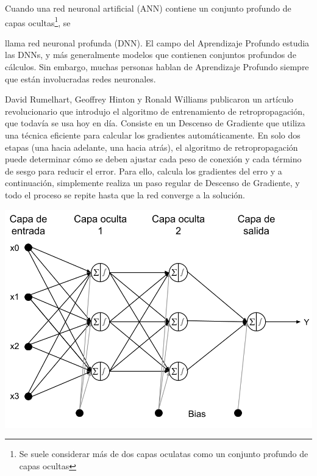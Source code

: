 Cuando una red neuronal artificial (ANN) contiene un conjunto profundo de capas ocultas\footnote{Se suele considerar más de dos capas oculatas como un conjunto profundo de capas ocultas}, se 
\begin{minipage}{0.54\textwidth}
llama red neuronal profunda (DNN). El campo del Aprendizaje Profundo estudia las DNNs, y más generalmente modelos que contienen conjuntos profundos de cálculos. Sin embargo, muchas personas hablan de Aprendizaje Profundo siempre que están involucradas redes neuronales.

\bigskip

David Rumelhart, Geoffrey Hinton y Ronald Williams publicaron un artículo revolucionario que introdujo el algoritmo de entrenamiento de retropropagación, que todavía se usa hoy en día. Consiste en un Descenso de Gradiente que utiliza una técnica eficiente para calcular los gradientes automáticamente. En solo dos etapas (una hacia adelante, una hacia atrás), el algoritmo de retropropagación puede determinar cómo se deben ajustar cada peso de conexión y cada término de sesgo para reducir el error. Para ello, calcula los gradientes del erro y a continuación, simplemente realiza un paso regular de Descenso de Gradiente, y todo el proceso se repite hasta que la red converge a la solución.

\end{minipage}
\begin{minipage}{0.05\textwidth}
\textbf{ }
\end{minipage}
\begin{minipage}{0.4\textwidth}
	\includegraphics[width=1.1\textwidth]{img/multicapa}
	\label{fig:mlp_architecture}
\end{minipage}

